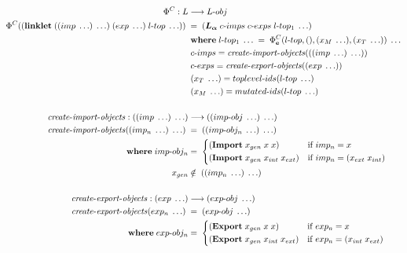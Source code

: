 \documentclass[sigplan,screen,anonymous]{acmart}
\def\dash {\text{-}}
\begin{document}
\begin{figure*}[tbp]
  \small
  \begin{align*}
    \Phi^C : L &\longrightarrow L\dash obj \\
    \Phi^C((\textbf{linklet}\; ((imp\; \ldots)\; \ldots)\; (exp\; \ldots)\; l\dash top\; \ldots))\; &=\; (\la\; c\dash imps\; c\dash exps\; l\dash top_1\; \ldots) \\
    \;        &\; \where l\dash top_1\; \ldots\; =\; \Phi^C_{\textbf{e}}(l\dash top,(),(x_M\;\ldots),(x_T\;\ldots))\; \ldots \\
    \;        &\; c\dash imps = \mathit{create\dash import\dash objects}(((imp\; \ldots)\; \ldots)) \\
    \;        &\; c\dash exps = \mathit{create\dash export\dash objects}((exp\; \ldots)) \\
    \;        &\; (x_T\;\ldots) = toplevel\dash ids(l\dash top\; \ldots) \\
    \;        &\; (x_M\;\ldots) = mutated\dash ids(l\dash top\; \ldots) \\ \\
    \mathit{create\dash import\dash objects} : ((imp\; \ldots)\; \ldots) &\longrightarrow ((imp\dash obj\; \ldots)\; \ldots) \\
    \mathit{create\dash import\dash objects}((imp_n\; \ldots)\; \ldots)\; &=\; ((imp\dash obj_n\; \ldots)\; \ldots) \\
    \;   \where imp\dash obj_n  &=\; \begin{cases*}
      (\textbf{Import}\;x_{gen}\;x\;x) & if $imp_n = x$ \\
      (\textbf{Import}\;x_{gen}\;x_{int}\;x_{ext}) & if $imp_n = (x_{ext}\;x_{int})$ \\
    \end{cases*} \\
    \;     x_{gen} &\notin\; ((imp_n\; \ldots)\; \ldots) \\ \\
    \mathit{create\dash export\dash objects} : (exp\; \ldots) &\longrightarrow (exp\dash obj\; \ldots) \\
    \mathit{create\dash export\dash objects}(exp_n\; \ldots)\; &=\; (exp\dash obj\; \ldots) \\
    \;   \where exp\dash obj_n  &=\; \begin{cases*}
      (\textbf{Export}\;x_{gen}\;x\;x) & if $exp_n = x$ \\
      (\textbf{Export}\;x_{gen}\;x_{int}\;x_{ext}) & if $exp_n = (x_{int}\;x_{ext})$ \\

\end{cases*}
\end{align*}
\end{figure*}
\end{document}
